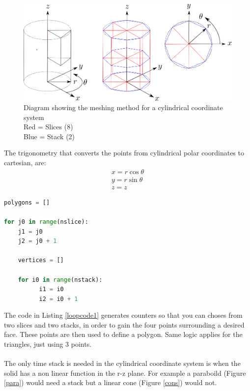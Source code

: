 \documentclass[12pt,a4paper]{article}
\begin{document}
\begin{figure}[h!]
\centering
\includegraphics[scale=0.5]{Images//Coords//cyl.png}
\caption[width=\columnwidth]{Diagram showing the meshing method for a cylindrical coordinate system\\
Red = Slices (8)\\
Blue = Stack (2)}
\label{cylmeshin}
\end{figure}

The trigonometry that converts the points from cylindrical polar coordinates to cartesian, are:
\begin{equation}
\begin{split}
x = r \cos{\theta} \\
y = r \sin{\theta} \\
z = z
\end{split}
\end{equation}

\label{loopcode1} 
\begin{lstlisting}[language=Python, caption=Python example]
polygons = []

for j0 in range(nslice):
    j1 = j0
    j2 = j0 + 1
    
    vertices = []

    for i0 in range(nstack):
          i1 = i0
          i2 = i0 + 1     

\end{lstlisting}
The code in Listing \ref{loopcode1} generates counters so that you can choses from two slices and two stacks, in order to gain the four points surrounding a desired face. These points are then used to define a polygon. Same logic applies for the triangles, just using 3 points.
\\\\
The only time stack is needed in the cylindrical coordinate system is when the solid has a non linear function in the r-z plane. For example a paraboild (Figure \ref{para}) would need a stack but a linear cone (Figure \ref{cons}) would not.
\end{document}
